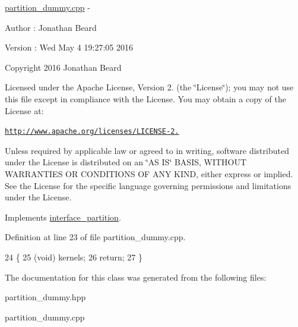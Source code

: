 \hyperlink{partition__dummy_8cpp_source}{partition\+\_\+dummy.\+cpp} -\/ \begin{DoxyAuthor}{Author}
\+: Jonathan Beard 
\end{DoxyAuthor}
\begin{DoxyVersion}{Version}
\+: Wed May 4 19\+:27\+:05 2016
\end{DoxyVersion}
Copyright 2016 Jonathan Beard

Licensed under the Apache License, Version 2. (the \char`\"{}\+License\char`\"{}); you may not use this file except in compliance with the License. You may obtain a copy of the License at\+:

\href{http://www.apache.org/licenses/LICENSE-2.0}{\tt http\+://www.\+apache.\+org/licenses/\+L\+I\+C\+E\+N\+S\+E-\/2.}

Unless required by applicable law or agreed to in writing, software distributed under the License is distributed on an \char`\"{}\+A\+S I\+S\char`\"{} B\+A\+S\+IS, W\+I\+T\+H\+O\+UT W\+A\+R\+R\+A\+N\+T\+I\+ES OR C\+O\+N\+D\+I\+T\+I\+O\+NS OF A\+NY K\+I\+ND, either express or implied. See the License for the specific language governing permissions and limitations under the License. 

Implements \hyperlink{classinterface__partition_a7161f6277517624347fda38c8ffa019d}{interface\+\_\+partition}.



Definition at line 23 of file partition\+\_\+dummy.\+cpp.


\begin{DoxyCode}
24 \{
25     (void) kernels;
26     \textcolor{keywordflow}{return};
27 \}
\end{DoxyCode}


The documentation for this class was generated from the following files\+:\begin{DoxyCompactItemize}
\item 
partition\+\_\+dummy.\+hpp\item 
partition\+\_\+dummy.\+cpp\end{DoxyCompactItemize}

